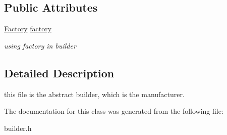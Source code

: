 \subsection*{Public Attributes}
\begin{DoxyCompactItemize}
\item 
\mbox{\label{classmanufacturer_ac73ee10721c5d41dc1f2d07128ea33d9}} 
\mbox{\hyperlink{class_factory}{Factory}} \mbox{\hyperlink{classmanufacturer_ac73ee10721c5d41dc1f2d07128ea33d9}{factory}}
\begin{DoxyCompactList}\small\item\em using factory in builder \end{DoxyCompactList}\end{DoxyCompactItemize}


\subsection{Detailed Description}
this file is the abstract builder, which is the manufacturer. 

The documentation for this class was generated from the following file\+:\begin{DoxyCompactItemize}
\item 
builder.\+h\end{DoxyCompactItemize}
